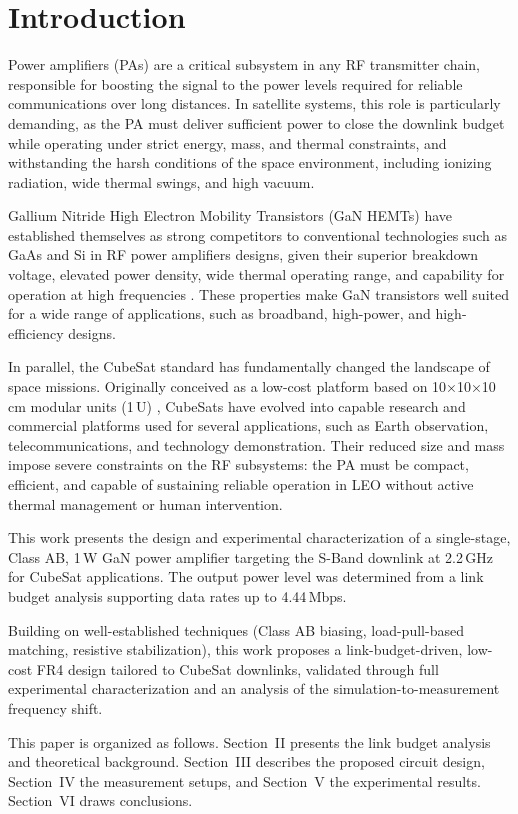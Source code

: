\section{Introduction}
Power amplifiers (PAs) are a critical subsystem in any RF transmitter chain, responsible for boosting the signal to the power levels required for reliable communications over long distances. In satellite systems, this role is particularly demanding, as the PA must deliver sufficient power to close the downlink budget while operating under strict energy, mass, and thermal constraints, and withstanding the harsh conditions of the space environment, including ionizing radiation, wide thermal swings, and high vacuum.

Gallium Nitride High Electron Mobility Transistors (GaN HEMTs) have established themselves as strong competitors to conventional technologies such as GaAs and Si in RF power amplifiers designs, given their superior breakdown voltage, elevated power density, wide thermal operating range, and capability for operation at high frequencies \cite{Boomer2020, Mishra2008, Deblecker2015}. These properties make GaN transistors well suited for a wide range of applications, such as broadband, high-power, and high-efficiency designs.

In parallel, the CubeSat standard has fundamentally changed the landscape of space missions. Originally conceived as a low-cost platform based on 10×10×10\,cm modular units (1\,U) \cite{cubesat_design_spec}, CubeSats have evolved into capable research and commercial platforms used for several applications, such as Earth observation, telecommunications, and technology demonstration. Their reduced size and mass impose severe constraints on the RF subsystems: the PA must be compact, efficient, and capable of sustaining reliable operation in LEO without active thermal management or human intervention.

This work presents the design and experimental characterization of a single-stage, Class AB, 1\,W GaN power amplifier targeting the S-Band downlink at 2.2\,GHz for CubeSat applications. The output power level was determined from a link budget analysis supporting data rates up to 4.44\,Mbps.

Building on well-established techniques (Class AB biasing, load-pull-based matching, resistive stabilization), this work proposes a link-budget-driven, low-cost FR4 design tailored to CubeSat downlinks, validated through full experimental characterization and an analysis of the simulation-to-measurement frequency shift.

This paper is organized as follows. Section~II presents the link budget analysis and theoretical background. Section~III describes the proposed circuit design, Section~IV the measurement setups, and Section~V the experimental results. Section~VI draws conclusions.